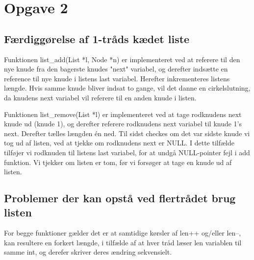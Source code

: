 \section{Opgave 2}

\subsection{Færdiggørelse af 1-tråds kædet liste}
Funktionen list\_add(List *l, Node *n) er implementeret ved at referere til den nye knude fra den bagerste knudes "next" variabel, og derefter indsætte en reference til nye knude i listens last variabel. Herefter inkrementeres listens længde. 
Hvis samme knude bliver indsat to gange, vil det danne en cirkelslutning, da knudens next variabel vil referere til en anden knude i listen.

Funktionen list\_remove(List *l) er implementeret ved at tage rodknudens next knude ud (knude 1), og derefter referere rodknudens next variabel til knude 1's next. Derefter tælles længden én ned. Til sidst checkes om det var sidste knude vi tog ud af listen, ved at tjekke om rodknudens next er NULL. I dette tilfælde tilføjer vi rodknuden til listens last variabel, for at undgå NULL-pointer fejl i add funktion. Vi tjekker om listen er tom, før vi forsøger at tage en knude ud af listen.

\subsection{Problemer der kan opstå ved flertrådet brug listen}
For begge funktioner gælder det er at samtidige kørsler af len++ og/eller len--, kan resultere en forkert længde, i tilfælde af at hver tråd læser len variablen til samme int, og derefer skriver deres ændring sekvensielt.

